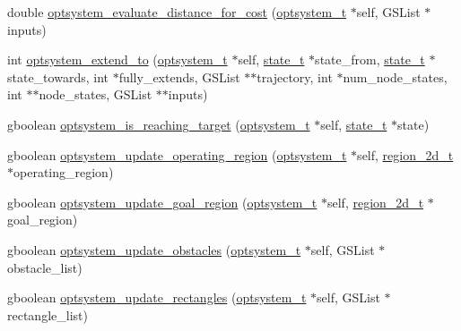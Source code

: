 \begin{DoxyCompactItemize}
\item 
double \hyperlink{a00018_acb788463670e5a6ef08d3759e8fc22ba_acb788463670e5a6ef08d3759e8fc22ba}{optsystem\-\_\-evaluate\-\_\-distance\-\_\-for\-\_\-cost} (\hyperlink{a00018_a48d08bbb4534f55ba817743a2b91360c_a48d08bbb4534f55ba817743a2b91360c}{optsystem\-\_\-t} $\ast$self, \-G\-S\-List $\ast$inputs)
\item 
int \hyperlink{a00018_ab7f5b908723750c22585fb8d58f2c17f_ab7f5b908723750c22585fb8d58f2c17f}{optsystem\-\_\-extend\-\_\-to} (\hyperlink{a00018_a48d08bbb4534f55ba817743a2b91360c_a48d08bbb4534f55ba817743a2b91360c}{optsystem\-\_\-t} $\ast$self, \hyperlink{a00018_a1c9d0bb39483d4981491e6383b0dbb47_a1c9d0bb39483d4981491e6383b0dbb47}{state\-\_\-t} $\ast$state\-\_\-from, \hyperlink{a00018_a1c9d0bb39483d4981491e6383b0dbb47_a1c9d0bb39483d4981491e6383b0dbb47}{state\-\_\-t} $\ast$state\-\_\-towards, int $\ast$fully\-\_\-extends, \-G\-S\-List $\ast$$\ast$trajectory, int $\ast$num\-\_\-node\-\_\-states, int $\ast$$\ast$node\-\_\-states, \-G\-S\-List $\ast$$\ast$inputs)
\item 
gboolean \hyperlink{a00018_a6e1675238ed175e198390a142a966fbb_a6e1675238ed175e198390a142a966fbb}{optsystem\-\_\-is\-\_\-reaching\-\_\-target} (\hyperlink{a00018_a48d08bbb4534f55ba817743a2b91360c_a48d08bbb4534f55ba817743a2b91360c}{optsystem\-\_\-t} $\ast$self, \hyperlink{a00018_a1c9d0bb39483d4981491e6383b0dbb47_a1c9d0bb39483d4981491e6383b0dbb47}{state\-\_\-t} $\ast$state)
\item 
gboolean \hyperlink{a00018_a3af82be1a1df5324149ee8a6450e0381_a3af82be1a1df5324149ee8a6450e0381}{optsystem\-\_\-update\-\_\-operating\-\_\-region} (\hyperlink{a00018_a48d08bbb4534f55ba817743a2b91360c_a48d08bbb4534f55ba817743a2b91360c}{optsystem\-\_\-t} $\ast$self, \hyperlink{a00018_a9136102e25aac8406a94d89f5a95bd1f_a9136102e25aac8406a94d89f5a95bd1f}{region\-\_\-2d\-\_\-t} $\ast$operating\-\_\-region)
\item 
gboolean \hyperlink{a00018_a086fb96570b474b5658dc991c8becc79_a086fb96570b474b5658dc991c8becc79}{optsystem\-\_\-update\-\_\-goal\-\_\-region} (\hyperlink{a00018_a48d08bbb4534f55ba817743a2b91360c_a48d08bbb4534f55ba817743a2b91360c}{optsystem\-\_\-t} $\ast$self, \hyperlink{a00018_a9136102e25aac8406a94d89f5a95bd1f_a9136102e25aac8406a94d89f5a95bd1f}{region\-\_\-2d\-\_\-t} $\ast$goal\-\_\-region)
\item 
gboolean \hyperlink{a00018_a0ad4a450490357b767cd191a83d2cdec_a0ad4a450490357b767cd191a83d2cdec}{optsystem\-\_\-update\-\_\-obstacles} (\hyperlink{a00018_a48d08bbb4534f55ba817743a2b91360c_a48d08bbb4534f55ba817743a2b91360c}{optsystem\-\_\-t} $\ast$self, \-G\-S\-List $\ast$obstacle\-\_\-list)
\item 
gboolean \hyperlink{a00018_afaee017543d17527597efd3a34a7c317_afaee017543d17527597efd3a34a7c317}{optsystem\-\_\-update\-\_\-rectangles} (\hyperlink{a00018_a48d08bbb4534f55ba817743a2b91360c_a48d08bbb4534f55ba817743a2b91360c}{optsystem\-\_\-t} $\ast$self, \-G\-S\-List $\ast$rectangle\-\_\-list)
\end{DoxyCompactItemize}


